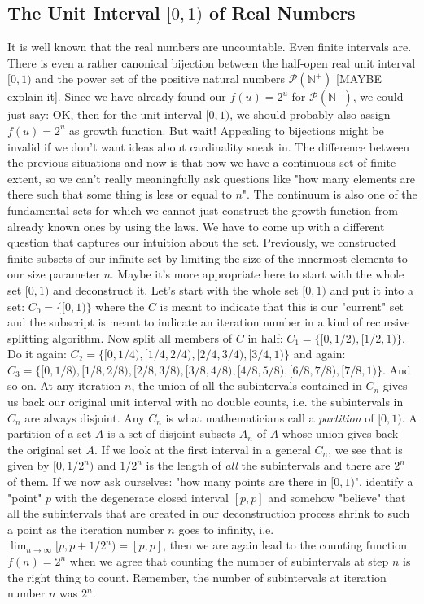 \documentclass[12pt]{article}
\begin{document}
\subsection{The Unit Interval $[0,1)$ of Real Numbers}
It is well known that the real numbers are uncountable. Even finite intervals are. There is even a rather canonical bijection between the half-open real unit interval $[0,1)$ and the power set of the positive natural numbers $\mathcal{P}(\mathbb{N}^+)$ [MAYBE explain it]. Since we have already found our $f(u) = 2^u$ for $\mathcal{P}(\mathbb{N}^+)$, we could just say: OK, then for the unit interval $[0,1)$, we should probably also assign $f(u) = 2^u$ as growth function. But wait! Appealing to bijections might be invalid if we don't want ideas about cardinality sneak in. The difference between the previous situations and now is that now we have a continuous set of finite extent, so we can't really meaningfully ask questions like "how many elements are there such that some thing is less or equal to $n$". The continuum is also one of the fundamental sets for which we cannot just construct the growth function from already known ones by using the laws. We have to come up with a different question that captures our intuition about the set. Previously, we constructed finite subsets of our infinite set by limiting the size of the innermost elements to our size parameter $n$. Maybe it's more appropriate here to start with the whole set $[0,1)$ and deconstruct it. Let's start with the whole set $[0,1)$ and put it into a set: $C_0 = \{[0,1)\}$ where the $C$ is meant to indicate that this is our "current" set and the subscript is meant to indicate an iteration number in a kind of recursive splitting algorithm. Now split all members of $C$ in half: $C_1 = \{[0,1/2), [1/2,1)\}$. Do it again: $C_2 = \{[0,1/4), [1/4,2/4), [2/4,3/4), [3/4,1)\}$ and again: $C_3 = \{[0,1/8), [1/8,2/8), [2/8,3/8), [3/8,4/8), [4/8,5/8), [6/8,7/8), [7/8,1)\}$. And so on. At any iteration $n$, the union of all the subintervals contained in $C_n$ gives us back our original unit interval with no double counts, i.e. the subintervals in $C_n$ are always disjoint. Any $C_n$ is what mathematicians call a \emph{partition} of $[0,1)$. A partition of a set $A$ is a set of disjoint subsets $A_n$ of $A$ whose union gives back the original set $A$. If we look at the first interval in a general $C_n$, we see that is given by $[0,1/2^n)$ and $1/2^n$ is the length of \emph{all} the subintervals and there are $2^n$ of them. If we now ask ourselves: "how many points are there in $[0,1)$", identify a "point" $p$ with the degenerate closed interval $[p,p]$ and somehow "believe" that all the subintervals that are created in our deconstruction process shrink to such a point as the iteration number $n$ goes to infinity, i.e. $\lim_{n \rightarrow \infty} [p,p + 1/2^n) = [p,p]$, then we are again lead to the counting function $f(n) = 2^n$ when we agree that counting the number of subintervals at step $n$ is the right thing to count. Remember, the number of subintervals at iteration number $n$ was $2^n$. 
\end{document}

